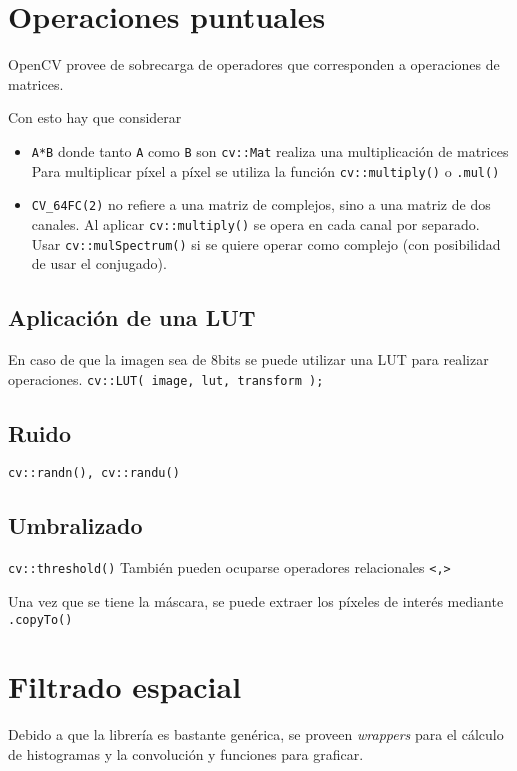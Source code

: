 \documentclass[oneside,a4paper]{book}
\begin{document}
\chapter{Operaciones puntuales}
	OpenCV provee de sobrecarga de operadores que corresponden a operaciones de matrices.

	Con esto hay que considerar
	\begin{itemize}
		\item \verb|A*B| donde tanto \texttt{A} como \texttt{B} son \texttt{cv::Mat}
			realiza una multiplicación de matrices %
			Para multiplicar píxel a píxel se utiliza la función \verb|cv::multiply()|
			o \verb|.mul()|

		\item \verb|CV_64FC(2)| no refiere a una matriz de complejos, sino a una matriz de dos canales.
			Al aplicar \verb|cv::multiply()| se opera en cada canal por separado.
			Usar \verb|cv::mulSpectrum()| si se quiere operar como complejo (con posibilidad de usar el conjugado).
	\end{itemize}

	\section{Aplicación de una LUT}
		En caso de que la imagen sea de 8bits se puede utilizar una LUT para realizar operaciones.
		\verb|cv::LUT( image, lut, transform );|

	\section{Ruido}
		\verb|cv::randn(), cv::randu()|

	\section{Umbralizado}
		\verb|cv::threshold()|
		También pueden ocuparse operadores relacionales \verb|<,>|

		Una vez que se tiene la máscara, se puede extraer los píxeles de interés mediante \verb|.copyTo()|

\chapter{Filtrado espacial}
	Debido a que la librería es bastante genérica, se proveen \emph{wrappers} para el cálculo de histogramas y la convolución y funciones para graficar.
\end{document}
